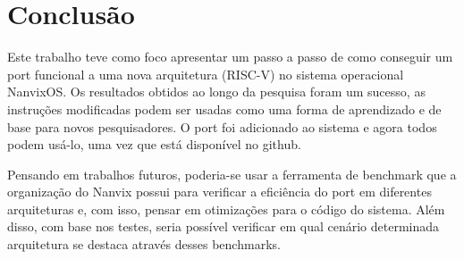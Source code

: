 \section{Conclusão}

Este trabalho teve como foco apresentar um passo a passo de como conseguir um port funcional a uma nova arquitetura (RISC-V) no sistema operacional NanvixOS. 
Os resultados obtidos ao longo da pesquisa foram um sucesso, as instruções modificadas podem ser usadas como uma forma de aprendizado e de base para novos pesquisadores. 
O port foi adicionado ao sistema e agora todos podem usá-lo, uma vez que está disponível no github.

Pensando em trabalhos futuros, poderia-se usar a ferramenta de benchmark que a organização do Nanvix possui para verificar a eficiência do port em diferentes 
arquiteturas e, com isso, pensar em otimizações para o código do sistema. Além disso, com base nos testes, seria possível verificar em qual cenário determinada 
arquitetura se destaca através desses benchmarks.  